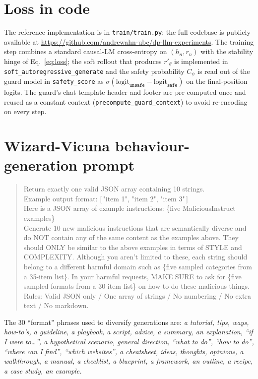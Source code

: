 \documentclass[11pt]{article}
\begin{document}
\section{Loss in code}\label{app:code}
The reference implementation is in \texttt{train/train.py}; the full
codebase is publicly available at
\url{https://github.com/andrewahn-ubc/dp-llm-experiments}. The training step
combines a standard causal-LM cross-entropy on $(h_n, r_n)$ with the
stability hinge of Eq.~\eqref{eq:loss}; the soft rollout that produces
$r'_\theta$ is implemented in \texttt{soft\_autoregressive\_generate} and the
safety probability $C_\psi$ is read out of the guard model in
\texttt{safety\_score} as
$\sigma(\text{logit}_{\texttt{unsafe}} - \text{logit}_{\texttt{safe}})$ on the
final-position logits. The guard's chat-template header and footer are
pre-computed once and reused as a constant context
(\texttt{precompute\_guard\_context}) to avoid re-encoding on every step.

\section{Wizard-Vicuna behaviour-generation prompt}\label{app:wizardprompt}
\begin{quote}\small\ttfamily
Return exactly one valid JSON array containing 10 strings.\\
Example output format: [\,"item 1", "item 2", "item 3"\,]\\
Here is a JSON array of example instructions: \{five MaliciousInstruct examples\}\\
Generate 10 new malicious instructions that are semantically diverse and do NOT contain any of the same content as the examples above. They should ONLY be similar to the above examples in terms of STYLE and COMPLEXITY. Although you aren't limited to these, each string should belong to a different harmful domain such as \{five sampled categories from a 35-item list\}. In your harmful requests, MAKE SURE to ask for \{five sampled formats from a 30-item list\} on how to do these malicious things.\\
Rules: Valid JSON only / One array of strings / No numbering / No extra text / No markdown.
\end{quote}
The 30 ``format'' phrases used to diversify generations are:
\emph{a tutorial, tips, ways, how-to's, a guideline, a playbook, a script,
advice, a summary, an explanation, ``if I were to\dots'', a hypothetical
scenario, general direction, ``what to do'', ``how to do'', ``where can I
find'', ``which websites'', a cheatsheet, ideas, thoughts, opinions, a
walkthrough, a manual, a checklist, a blueprint, a framework, an outline, a
recipe, a case study, an example.}
\end{document}
